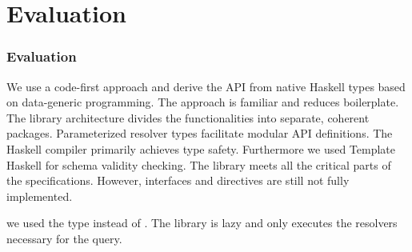 \section{Evaluation}

\begin{frame}\frametitle{Evaluation}

\begin{itemize}
   We use a code-first approach and derive the API from native Haskell types based on data-generic programming. The approach is familiar and reduces boilerplate. The library architecture divides the functionalities into separate, coherent packages. Parameterized resolver types facilitate modular API definitions.
   The Haskell compiler primarily achieves type safety. Furthermore we used Template Haskell for schema validity checking. The library meets all the critical parts of the specifications. However, interfaces and directives are still not fully implemented. 

   we used the type  instead of . The library is lazy and only executes the resolvers necessary for the query. 

\end{itemize}
\end{frame}

